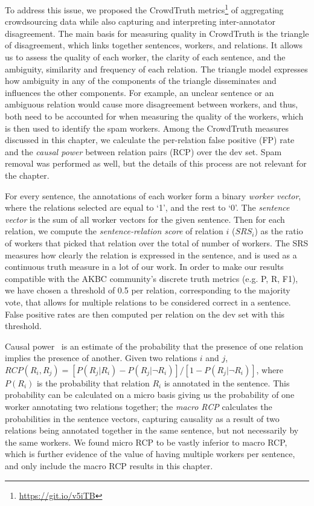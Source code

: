 To address this issue, we proposed the CrowdTruth metrics\footnote{\url{https://git.io/v5iTB}} of aggregating crowdsourcing data while also capturing and interpreting inter-annotator disagreement. The main basis for measuring quality in CrowdTruth is the triangle of disagreement, which links together sentences, workers, and relations. It allows us to assess the quality of each worker, the clarity of each sentence, and the ambiguity, similarity and frequency of each relation. The triangle model expresses how ambiguity in any of the components of the triangle disseminates and influences the other components. For example, an unclear sentence or an ambiguous relation would cause more disagreement between workers, and thus, both need to be accounted for when measuring the quality of the workers, which is then used to identify the spam workers. Among the CrowdTruth measures discussed in this chapter, we calculate the per-relation false positive (FP) rate and the \textit{causal power} between relation pairs (RCP) over the dev set. Spam removal was performed as well, but the details of this process are not relevant for the chapter.

For every sentence, the annotations of each worker form a binary \textit{worker vector}, where the relations selected are equal to `1', and the rest to `0'. The \textit{sentence vector} is the sum of all worker vectors for the given sentence. Then for each relation, we compute the \textit{sentence-relation score} of relation $i$ ($SRS_i$) as the ratio of workers that picked that relation over the total of number of workers. The SRS measures how clearly the relation is expressed in the sentence, and is used as a continuous truth measure in a lot of our work.  In order to make our results compatible with the AKBC community's discrete truth metrics (e.g. P, R, F1), we have chosen a threshold of 0.5 per relation, corresponding to the majority vote, that allows for multiple relations to be considered correct in a sentence.  False positive rates are then computed per relation on the dev set with this threshold.

Causal power~\cite{cheng1997causalpower} is an estimate of the probability that the presence of one relation implies the presence of another. Given two relations $i$ and $j$, $ RCP(R_i, R_j) = [ P(R_{j} | R_{i} ) - P(R_{j} | \neg R_{i} ) ] / [1 - P(R_{j} | \neg R_{i} )]$, where $P(R_{i})$ is the probability that relation $R_i$ is annotated in the sentence. This probability can be calculated on a micro basis giving us the probability of one worker annotating two relations together; the \textit{macro RCP} calculates the probabilities in the sentence vectors, capturing causality as a result of two relations being annotated together in the same sentence, but not necessarily by the same workers.  We found micro RCP to be vastly inferior to macro RCP, which is further evidence of the value of having multiple workers per sentence, and only include the macro RCP results in this chapter.  

